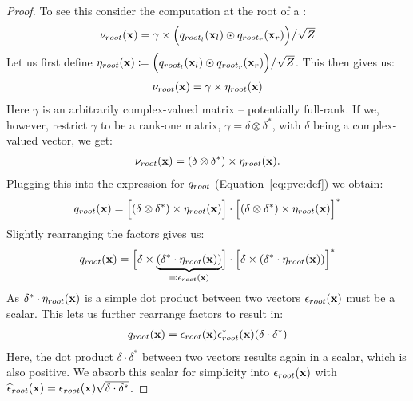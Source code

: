 \begin{proof}
	To  see this consider the computation at the root of a \pvc:
	\begin{align}
		\nu_{root}(\mathbf{x})
		=
		\gamma
		\times
		\Bigl(
		q_{root_l}(\mathbf{x}_{l})
		\odot
		q_{root_r}(\mathbf{x}_{r})
		\Bigr)
		\big/ \sqrt{Z}
	\end{align}
	Let us first define $\eta_{root}(\mathbf{x}) \coloneqq 			\Bigl(
		q_{root_l}(\mathbf{x}_{l})
		\odot
		q_{root_r}(\mathbf{x}_{r})
		\Bigr)
		\big/ \sqrt{Z} $.
	This then gives us:
	\begin{align}
		\nu_{root}(\mathbf{x})
		=
		\gamma
		\times
		\eta_{root}(\mathbf{x})
	\end{align}
	Here $\gamma$ is an arbitrarily complex-valued matrix -- potentially full-rank.
	If we, however, restrict $\gamma$ to be a rank-one matrix, \ie $\gamma = \delta \otimes \delta^*$, with $\delta$ being a complex-valued vector, we get:
	\begin{align}
		\nu_{root}(\mathbf{x})
		=
		(
		\delta
		\otimes
		\delta^*
		)
		\times
		\eta_{root}(\mathbf{x}).
	\end{align}
	Plugging this into the expression for $q_{root}$ (\cf Equation~\ref{eq:pvc:def}) we obtain:
	\begin{align}
		q_{root}(\mathbf{x})
		=
		\Bigl[
			(
			\delta
			\otimes
			\delta^*
			)
			\times
			\eta_{root}(\mathbf{x})
			\Bigr]
		\cdot
		\Bigl[
			(
			\delta
			\otimes
			\delta^*
			)
			\times
			\eta_{root}(\mathbf{x})
			\Bigr]^*
	\end{align}
	Slightly rearranging the factors gives us:
	\begin{align}
		q_{root}(\mathbf{x})
		=
		\Bigl[
			\delta
			\times
			\underbrace{
				(
				\delta^*
				\cdot
				\eta_{root}(\mathbf{x})
				)}_{\eqqcolon \epsilon_{root}(\mathbf{x})}
			\Bigr]
		\cdot
		\Bigl[
			\delta
			\times
			(
			\delta^*
			\cdot
			\eta_{root}(\mathbf{x})
			)
			\Bigr]^*
	\end{align}
	As $\delta^* \cdot \eta_{root}(\mathbf{x})$ is a  simple dot product between two vectors  $\epsilon_{root}(\mathbf{x})$ must be a scalar. This lets us further rearrange factors to result in:
	\begin{align}
		q_{root}(\mathbf{x})
		=
		\epsilon_{root}(\mathbf{x}) \epsilon^*_{root}(\mathbf{x}) ( \delta \cdot \delta^*)
	\end{align}
	Here, the dot product $\delta \cdot \delta^*$ between two vectors results again  in a scalar, which is also positive.
	We absorb this scalar for simplicity into $\epsilon_{root}(\mathbf{x})$ with $\widehat{\epsilon}_{root}(\mathbf{x}) = \epsilon_{root}(\mathbf{x}) \sqrt{ \delta \cdot \delta^*}$.

\end{proof}
